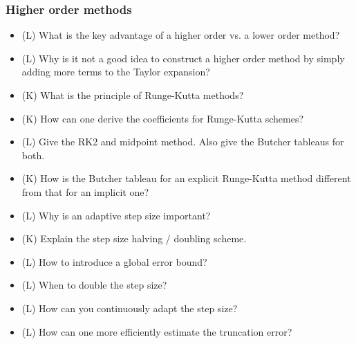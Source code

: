 \subsubsection*{Higher order methods}
\begin{itemize}
    \item (L) What is the key advantage of a higher order vs. a lower order method?
    \answerboxS
    \item (L) Why is it not a good idea to construct a higher order method by simply adding more terms to the Taylor expansion?
    \answerboxS
    \item (K) What is the principle of Runge-Kutta methods?
    \answerboxM
    \item (K) How can one derive the coefficients for Runge-Kutta schemes?
    \answerboxM
    \item (L) Give the RK2 and midpoint method. Also give the Butcher tableaus for both.
    \answerboxM
    \item (K) How is the Butcher tableau for an explicit Runge-Kutta method different from that for an implicit one?
    \answerboxM
    \item (L) Why is an adaptive step size important?
    \answerboxS
    \item (K) Explain the step size halving / doubling scheme.
    \answerboxM
    \item (L) How to introduce a global error bound?
    \answerboxS
    \item (L) When to double the step size?
    \answerboxM
    \item (L) How can you continuously adapt the step size?
    \answerboxM
    \item (L) How can one more efficiently estimate the truncation error?
    \answerboxS
\end{itemize}

